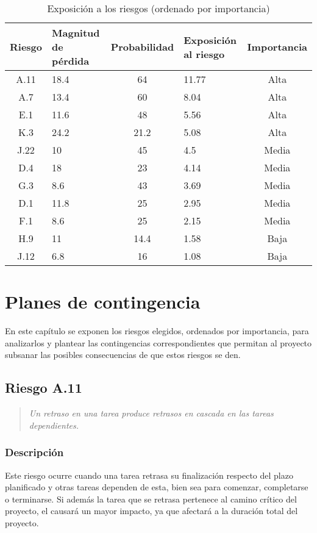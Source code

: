 \documentclass[11pt,a4paper,spanish,twoside]{book}
\begin{document}
\begin{table}[!h]
  \centering
  \begin{tabular}{|c|b{2.1cm}<{\centering}|c|b{2cm}<{\centering}|c|}
    \hline
    \textbf{Riesgo} & \textbf{Magnitud de pérdida} & \textbf{Probabilidad} & 
    \textbf{Exposición al riesgo} & \textbf{Importancia} \\
    \hline \hline
    A.11 & 18.4 & 64   & 11.77 & Alta  \\ \hline
    A.7  & 13.4 & 60   & 8.04  & Alta  \\ \hline 
    E.1  & 11.6 & 48   & 5.56  & Alta  \\ \hline
    K.3  & 24.2 & 21.2 & 5.08  & Alta  \\ \hline
    J.22 & 10   & 45   & 4.5   & Media \\ \hline
    D.4  & 18   & 23   & 4.14  & Media \\ \hline
    G.3  & 8.6  & 43   & 3.69  & Media \\ \hline
    D.1  & 11.8 & 25   & 2.95  & Media \\ \hline
    F.1  & 8.6  & 25   & 2.15  & Media \\ \hline
    H.9  & 11   & 14.4 & 1.58  & Baja  \\ \hline
    J.12 & 6.8  & 16   & 1.08  & Baja  \\ \hline
  \end{tabular}
  \caption{Exposición a los riesgos (ordenado por importancia)} 
  \label{Tab:Expor}
\end{table}

\chapter{Planes de contingencia}
En este capítulo se exponen los riesgos elegidos, ordenados por importancia,
para analizarlos y plantear las contingencias correspondientes que permitan
al proyecto subsanar las posibles consecuencias de que estos riesgos se den.

\section{Riesgo A.11}
\begin{quote}
  \emph{Un retraso en una tarea produce retrasos en cascada en las tareas
    dependientes.} 
\end{quote}

\subsection{Descripción}
Este riesgo ocurre cuando una tarea retrasa su finalización respecto del plazo
planificado y otras tareas dependen de esta, bien sea para comenzar, 
completarse o terminarse. Si además la tarea que se retrasa pertenece al camino
crítico del proyecto, el causará un mayor impacto, ya que afectará
a la duración total del proyecto.
\end{document}
